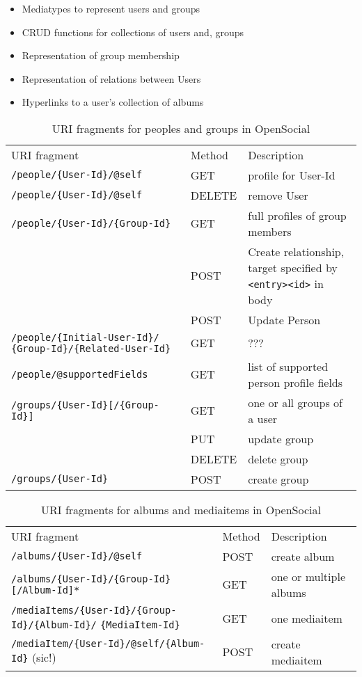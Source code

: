 \documentclass[12pt,a4paper,twoside]{scrartcl}		%
\begin{document}
\begin{itemize}
\item Mediatypes to represent users and groups
\item CRUD functions for collections of users and, groups
\item Representation of group membership
\item Representation of relations between Users
\item Hyperlinks to a user's collection of albums
\end{itemize}


\begin{table}[tbh]
\begin{tabular}{p{6.5cm} l p{10cm}}
  URI fragment & Method & Description \\
  \verb:/people/{User-Id}/@self: & GET & profile for User-Id \\
  \verb:/people/{User-Id}/@self: & DELETE & remove User \\
  \verb:/people/{User-Id}/{Group-Id}: & GET & full profiles of group members \\
  \verb:: & POST & Create relationship, target specified \newline by \verb:<entry><id>: in body \\
   & POST & Update Person \\
  \verb:/people/{Initial-User-Id}/: \newline \verb:{Group-Id}/{Related-User-Id}: & GET & ??? \\
  \verb:/people/@supportedFields: & GET & list of supported person profile fields \\
  \verb:/groups/{User-Id}[/{Group-Id}]: & GET & one or all groups of a user \\
   & PUT & update group \\
   & DELETE & delete group \\
  \verb:/groups/{User-Id}: & POST & create group \\
\end{tabular}
  \caption{URI fragments for peoples and groups in OpenSocial}
  \label{tab:OSURIPersons}
\end{table}

\begin{table}[tbh]
\begin{tabular}{p{9.5cm} l p{8cm}}
  URI fragment & Method & Description \\
  \verb:/albums/{User-Id}/@self: & POST & create album \\
  \verb:/albums/{User-Id}/{Group-Id}[/Album-Id]*: & GET & one or multiple albums \\
  \verb:/mediaItems/{User-Id}/{Group-Id}/{Album-Id}/: \newline \verb:{MediaItem-Id}: & GET & one mediaitem \\
  \verb:/mediaItem/{User-Id}/@self/{Album-Id}: (sic!) & POST & create mediaitem \\
\end{tabular}
  \caption{URI fragments for albums and mediaitems in OpenSocial}
  \label{tab:OSURIAlbums}
\end{table}
\end{document}
